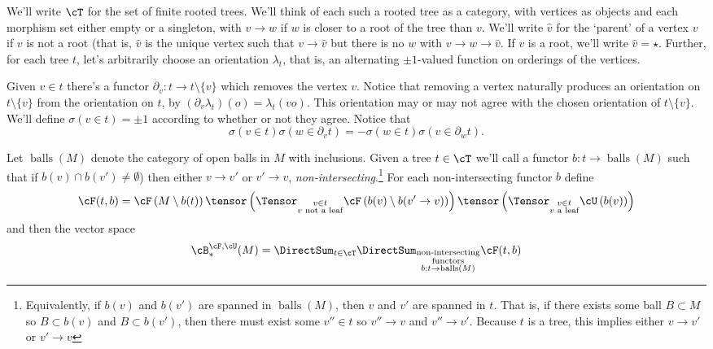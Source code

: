 We'll write $\cT$ for the set of finite rooted trees. We'll think of each such a rooted tree as a category, with vertices as objects  and each morphism set either empty or a singleton, with $v \to w$ if $w$ is closer to a root of the tree than $v$. We'll write $\hat{v}$ for the `parent' of a vertex $v$ if $v$ is not a root (that is, $\hat{v}$ is the unique vertex such that $v \to \hat{v}$ but there is no $w$ with $v \to w \to \hat{v}$. If $v$ is a root, we'll write $\hat{v}=\star$. Further, for each tree $t$, let's arbitrarily choose an orientation $\lambda_t$, that is, an alternating $\pm1$-valued function on orderings of the vertices.

Given $v \in t$ there's a functor $\partial_v : t \to t \setminus \{v\}$ which removes the vertex $v$. Notice that removing a vertex naturally produces an orientation on $t \setminus \{v\}$ from the orientation on $t$, by $(\partial_v \lambda_t)(o) = \lambda_t(vo)$. This orientation may or may not agree with the chosen orientation of $t \setminus \{v\}$. We'll define $\sigma(v \in t) = \pm 1$ according to whether or not they agree. Notice that $$\sigma(v \in t) \sigma(w \in \partial_v t) = - \sigma(w \in t) \sigma(v \in \partial_w t).$$

Let $\operatorname{balls}(M)$ denote the category of open balls in $M$ with inclusions. Given a tree $t \in \cT$ we'll call a functor $b : t \to \operatorname{balls}(M)$ such that if $b(v) \cap b(v') \neq \emptyset$) then either $v \to v'$ or $v' \to v$, \emph{non-intersecting}.\footnote{Equivalently, if $b(v)$ and $b(v')$ are spanned in $\operatorname{balls}(M)$, then $v$ and $v'$ are spanned in $t$. That is, if there exists some ball $B \subset M$ so $B \subset b(v)$ and $B \subset b(v')$, then there must exist some $v'' \in t$ so $v'' \to v$ and $v'' \to v'$. Because $t$ is a tree, this implies either $v \to v'$ or $v' \to v$} For each non-intersecting functor $b$ define  
\begin{equation*}
\cF(t,b) = \cF\left(M \setminus b(t)\right) \tensor \left(\Tensor_{\substack{v \in t \\ \text{$v$ not a leaf}}} \cF\left(b(v) \setminus b(v' \to v)\right)\right) \tensor \left(\Tensor_{\substack{v \in t \\ \text{$v$ a leaf}}} \cU\left(b(v)\right)\right)
\end{equation*}
and then the vector space
\begin{equation*}
\cB_*^{\cF,\cU}(M) = \DirectSum_{t \in \cT} \DirectSum_{\substack{\text{non-intersecting}\\\text{functors} \\ b: t \to \operatorname{balls}(M)}} \cF(t,b)
\end{equation*}

